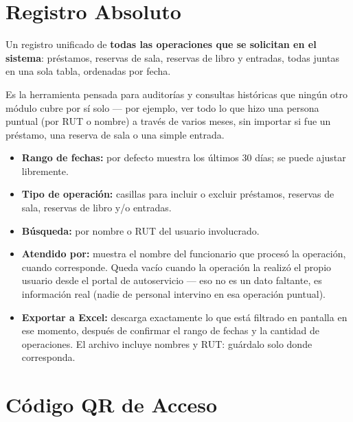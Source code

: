 \documentclass[11pt,a4paper]{report}
\begin{document}
\section{Registro Absoluto}
\label{cap:registro-absoluto}


Un registro unificado de \textbf{todas las operaciones que se solicitan
en el sistema}: préstamos, reservas de sala, reservas de libro y
entradas, todas juntas en una sola tabla, ordenadas por fecha.


Es la herramienta pensada para auditorías y consultas históricas que
ningún otro módulo cubre por sí solo --- por ejemplo, ver todo lo que
hizo una persona puntual (por RUT o nombre) a través de varios meses, sin
importar si fue un préstamo, una reserva de sala o una simple entrada.

\begin{itemize}
  \item \textbf{Rango de fechas:} por defecto muestra los últimos 30
  días; se puede ajustar libremente.
  \item \textbf{Tipo de operación:} casillas para incluir o excluir
  préstamos, reservas de sala, reservas de libro y/o entradas.
  \item \textbf{Búsqueda:} por nombre o RUT del usuario involucrado.
  \item \textbf{Atendido por:} muestra el nombre del funcionario que
  procesó la operación, cuando corresponde. Queda vacío cuando la
  operación la realizó el propio usuario desde el portal de autoservicio
  --- eso no es un dato faltante, es información real (nadie de personal
  intervino en esa operación puntual).
  \item \textbf{Exportar a Excel:} descarga exactamente lo que está
  filtrado en pantalla en ese momento, después de confirmar el rango de
  fechas y la cantidad de operaciones. El archivo incluye nombres y RUT:
  guárdalo solo donde corresponda.
\end{itemize}

\section{Código QR de Acceso}
\label{sec:codigo-qr}

\end{document}
